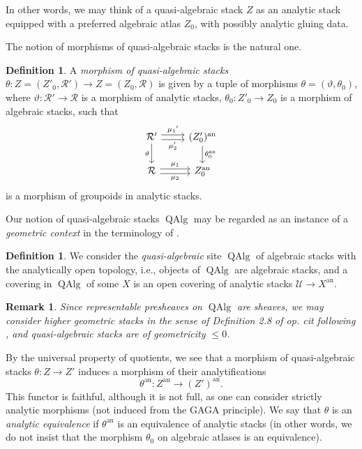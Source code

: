 \documentclass[11pt, a4paper]{amsart}
\numberwithin{equation}{section}
\newtheorem{remark}[theorem]{Remark}
\theoremstyle{definition}
\newtheorem{definition}[theorem]{Definition}
\theoremstyle{remark}
\DeclareMathOperator{\QAlg}{\mathrm{QAlg}}
\newcommand{\Rr}{\mathcal{R}}
\renewcommand{\to}{\longrightarrow}
\begin{document}
In other words, we may think of a quasi-algebraic stack $Z$ as an analytic stack equipped with a preferred algebraic atlas $Z_0$, with possibly analytic gluing data. 



The notion of morphisms of quasi-algebraic stacks is the natural one. 
\begin{definition}
A {\it morphism of quasi-algebraic stacks} $\theta : Z = (Z'_0, \mathcal{R}') \to Z = (Z_0, \mathcal{R})$ is given by a tuple of morphisms $\theta = (\vartheta , \theta_0)$, where $\vartheta : \Rr' \to \Rr$ is a morphism of analytic stacks, $\theta_0: Z'_0 \to Z_0$ is a morphism of algebraic stacks, such that 
\[\begin{tikzcd}
	\Rr' & {(Z'_0)^{\mathrm{an}}} \\
	\Rr & {Z_0^{\mathrm{an}}}
	\arrow["{\mu_2'}"', shift right, from=1-1, to=1-2]
	\arrow["{\mu_1}'", shift left, from=1-1, to=1-2]
	\arrow["\vartheta"', from=1-1, to=2-1]
	\arrow["{\theta_0^{\mathrm{an}}}", from=1-2, to=2-2]
	\arrow["{\mu_2}"', shift right, from=2-1, to=2-2]
	\arrow["{\mu_1}", shift left, from=2-1, to=2-2]
\end{tikzcd}
\]
is a morphism of groupoids in analytic stacks. 
\end{definition}

Our notion of quasi-algebraic stacks $\QAlg$ may be regarded as an instance of a \textit{geometric context} in the terminology of \cite[Definition 2.2]{porta&yu_rep}. 

\begin{definition}
We consider the \textit{quasi-algebraic} site $\QAlg$ of algebraic stacks with the analytically open topology, i.e., objects of $\QAlg$ are algebraic stacks, and a covering in $\QAlg$ of some $X$ is an open covering of analytic stacks $\mathcal{U} \to X^{\mathrm{an}}$. 
\end{definition}


\begin{remark} \label{remark qalg geometric context}
Since representable presheaves on $\QAlg$ are sheaves, we may consider higher geometric stacks in the sense of Definition 2.8 of \textit{op. cit} following \cite{simpson_geometricity}, and quasi-algebraic stacks are of geometricity $\leq 0$.
\end{remark}

By the universal property of quotients, we see that a morphism of quasi-algebraic stacks $\theta: Z \to Z'$ induces a morphism of their analytifications
$$\theta^{\mathrm{an}}: Z^{\mathrm{an}} \to (Z')^{\mathrm{an}}.$$
This functor is faithful, although it is not full, as one can consider strictly analytic morphisms (not induced from the GAGA principle). We say that $\theta$ is an \textit{analytic equivalence} if $\theta^{\mathrm{an}}$ is an equivalence of analytic stacks (in other words, we do not insist that the morphism $\theta_0$ on algebraic atlases is an equivalence).
\end{document}
